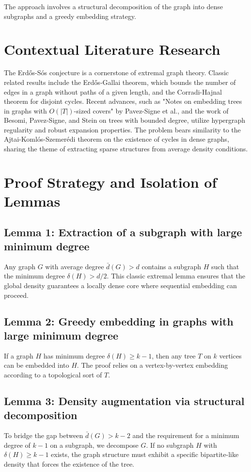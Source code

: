 \documentclass[11pt,a4paper]{article}
\begin{document}
The approach involves a structural decomposition of the graph into dense subgraphs and a greedy embedding strategy.

\section{Contextual Literature Research}

The Erd\H{o}s-S\'os conjecture is a cornerstone of extremal graph theory. Classic related results include the Erd\H{o}s-Gallai theorem, which bounds the number of edges in a graph without paths of a given length, and the Corradi-Hajnal theorem for disjoint cycles. Recent advances, such as "Notes on embedding trees in graphs with $O(|T|)$-sized covers" by Pavez-Signe et al., and the work of Besomi, Pavez-Signe, and Stein on trees with bounded degree, utilize hypergraph regularity and robust expansion properties. The problem bears similarity to the Ajtai-Koml\'os-Szemer\'edi theorem on the existence of cycles in dense graphs, sharing the theme of extracting sparse structures from average density conditions.

\section{Proof Strategy and Isolation of Lemmas}

\subsection{Lemma 1: Extraction of a subgraph with large minimum degree}
Any graph $G$ with average degree $\bar{d}(G) > d$ contains a subgraph $H$ such that the minimum degree $\delta(H) > d/2$. This classic extremal lemma ensures that the global density guarantees a locally dense core where sequential embedding can proceed.

\subsection{Lemma 2: Greedy embedding in graphs with large minimum degree}
If a graph $H$ has minimum degree $\delta(H) \geq k-1$, then any tree $T$ on $k$ vertices can be embedded into $H$. The proof relies on a vertex-by-vertex embedding according to a topological sort of $T$.

\subsection{Lemma 3: Density augmentation via structural decomposition}
To bridge the gap between $\bar{d}(G) > k-2$ and the requirement for a minimum degree of $k-1$ on a subgraph, we decompose $G$. If no subgraph $H$ with $\delta(H) \geq k-1$ exists, the graph structure must exhibit a specific bipartite-like density that forces the existence of the tree.
\end{document}
